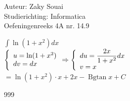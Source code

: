 \documentclass[a4paper]{article}
\newcommand{\Bgtan}{\operatorname{Bgtan}}
\begin{document}
  
\noindent \large Auteur: Zaky Souai \\
\noindent \large Studierichting:  Informatica\\
\noindent \large Oefeningenreeks 4A nr. 14.9\\

\bigskip

\normalsize

$\displaystyle\int \ln(1+x^2) dx$\\

$\left\{\begin{array}{l}u=\ln (1 + x^2) \\ dv = dx \end{array} \\ \Rightarrow \left\{\begin{array}{l}du= \dfrac{2x}{1+x^2}dx \\ v=x \end{array}\right.\right.$\\

$ = \ln(1+x^2) \cdot x + 2x - \Bgtan x +  C $


\begin{thebibliography}{999}
\end{thebibliography}
\end{document}
